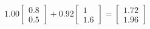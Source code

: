 \documentclass[preview]{standalone}
\begin{document}
\begin{align*}
1.00 \begin{bmatrix} 0.8 \\ 0.5 \end{bmatrix} + 0.92 \begin{bmatrix} 1 \\ 1.6 \end{bmatrix} = \begin{bmatrix} 1.72 \\ 1.96 \end{bmatrix}
\end{align*}
\end{document}
